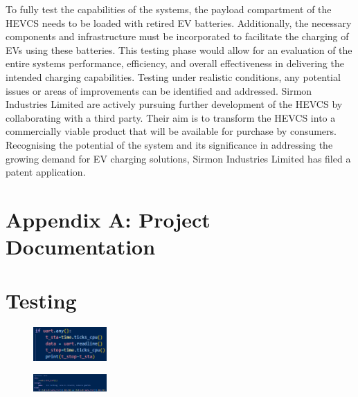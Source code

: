 \documentclass [12pt]{article}
\begin{document}
To fully test the capabilities of the systems, the payload compartment of the HEVCS needs to be loaded with retired EV batteries. Additionally, the necessary components and infrastructure must be incorporated to facilitate the charging of EVs using these batteries. This testing phase would allow for an evaluation of the entire systems performance, efficiency, and overall effectiveness in delivering the intended charging capabilities. Testing under realistic conditions, any potential issues or areas of improvements can be identified and addressed.
Sirmon Industries Limited are actively pursuing further development of the HEVCS by collaborating with a third party. Their aim is to transform the HEVCS into a commercially viable product that will be available for purchase by consumers. Recognising the potential of the system and its significance in addressing the growing demand for EV charging solutions, Sirmon Industries Limited has filed a patent application.




\newpage



\newpage
\appendix

\section{Appendix A: Project Documentation}

\section{Testing}

\begin{figure}[h]
    \centering
    \includegraphics[width=0.25\textwidth]{uartTest.png}
    \caption{}
    \label{fig:uartTest}
\end{figure}

\begin{figure}[h]
    \centering
    \includegraphics[width=0.25\textwidth]{uartTestData.png}
    \caption{}
    \label{fig:uartTestData}
\end{figure}
\end{document}

